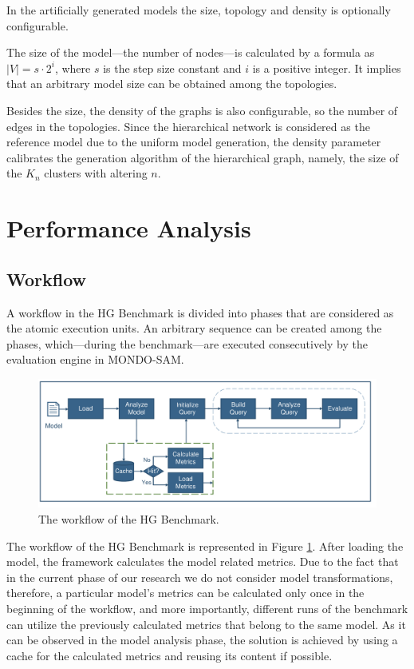 In the artificially generated models the size, topology and density is optionally configurable. 

The size of the model---the number of nodes---is calculated by a formula as $|V| = s \cdot 2^i$, where $s$ is the step size constant and $i$ is a positive integer. It implies that an arbitrary model size can be obtained among the topologies.

Besides the size, the density of the graphs is also configurable, so the number of edges in the topologies. Since the hierarchical network is considered as the reference model due to the uniform model generation, the density parameter calibrates the generation algorithm of the hierarchical graph, namely, the size of the $K_n$ clusters with altering $n$. 

\section{Performance Analysis}

\subsection{Workflow}

A workflow in the HG Benchmark is divided into phases that are considered as the atomic execution units. An arbitrary sequence can be created among the phases, which---during the benchmark---are executed consecutively by the evaluation engine in MONDO-SAM.

\begin{figure}[!ht]
	\centering
	\includegraphics[width=150mm, keepaspectratio]{figures/workflow.pdf}
	\caption{The workflow of the HG Benchmark.}
	\label{fig:mondo_map_workflow}
\end{figure}

The workflow of the HG Benchmark is represented in Figure \ref{fig:mondo_map_workflow}. After loading the model, the framework calculates the model related metrics. Due to the fact that in the current phase of our research we do not consider model transformations, therefore, a particular model's metrics can be calculated only once in the beginning of the workflow, and more importantly, different runs of the benchmark can utilize the previously calculated metrics that belong to the same model. As it can be observed in the model analysis phase, the solution is achieved by using a cache for the calculated metrics and reusing its content if possible.

